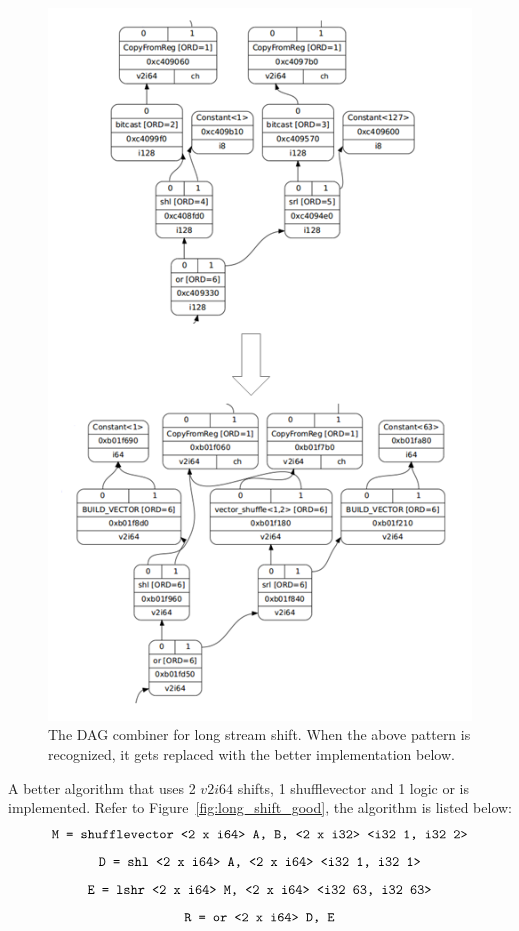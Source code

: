 \begin{figure}[htbp!]
\centering
\includegraphics[scale=0.8]{draw/long_shift_nodes.png}
\caption[The DAG combiner for long stream shift.]{The DAG combiner for long stream shift. When the above pattern is recognized, it gets replaced with the better implementation below.}
\label{fig:long_shift_nodes}
\end{figure}

A better algorithm that uses 2 $v2i64$ shifts, 1 shufflevector and 1 logic or is implemented. Refer to Figure~\ref{fig:long_shift_good}, the algorithm is listed below:
  \[ \text{\tt M = shufflevector <2 x i64> A, B, <2 x i32> <i32 1, i32 2>} \]
  \[ \text{\tt D = shl <2 x i64> A, <2 x i64> <i32 1, i32 1>} \]
  \[ \text{\tt E = lshr <2 x i64> M, <2 x i64> <i32 63, i32 63>} \]
  \[ \text{\tt R = or <2 x i64> D, E} \]

